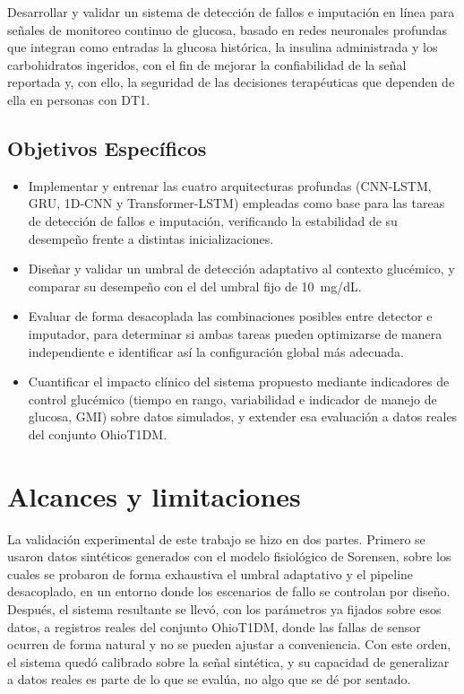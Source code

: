 \documentclass{report}
\begin{document}
Desarrollar y validar un sistema de detección de fallos e imputación en línea para señales de monitoreo continuo de glucosa, basado en redes neuronales profundas que integran como entradas la glucosa histórica, la insulina administrada y los carbohidratos ingeridos, con el fin de mejorar la confiabilidad de la señal reportada y, con ello, la seguridad de las decisiones terapéuticas que dependen de ella en personas con DT1.


\subsection{Objetivos Específicos}
\begin{itemize}
    \item Implementar y entrenar las cuatro arquitecturas profundas (CNN-LSTM, GRU, 1D-CNN y Transformer-LSTM) empleadas como base para las tareas de detección de fallos e imputación, verificando la estabilidad de su desempeño frente a distintas inicializaciones.

    \item Diseñar y validar un umbral de detección adaptativo al contexto glucémico, y comparar su desempeño con el del umbral fijo de 10~mg/dL.

    \item Evaluar de forma desacoplada las combinaciones posibles entre detector e imputador, para determinar si ambas tareas pueden optimizarse de manera independiente e identificar así la configuración global más adecuada.

    \item Cuantificar el impacto clínico del sistema propuesto mediante indicadores de control glucémico (tiempo en rango, variabilidad e indicador de manejo de glucosa, GMI) sobre datos simulados, y extender esa evaluación a datos reales del conjunto OhioT1DM.
\end{itemize}

\section{Alcances y limitaciones}
\label{sec:alcances_limitaciones}

La validación experimental de este trabajo se hizo en dos partes. Primero se usaron datos sintéticos generados con el modelo fisiológico de Sorensen, sobre los cuales se probaron de forma exhaustiva el umbral adaptativo y el pipeline desacoplado, en un entorno donde los escenarios de fallo se controlan por diseño. Después, el sistema resultante se llevó, con los parámetros ya fijados sobre esos datos, a registros reales del conjunto OhioT1DM, donde las fallas de sensor ocurren de forma natural y no se pueden ajustar a conveniencia. Con este orden, el sistema quedó calibrado sobre la señal sintética, y su capacidad de generalizar a datos reales es parte de lo que se evalúa, no algo que se dé por sentado.
\end{document}
